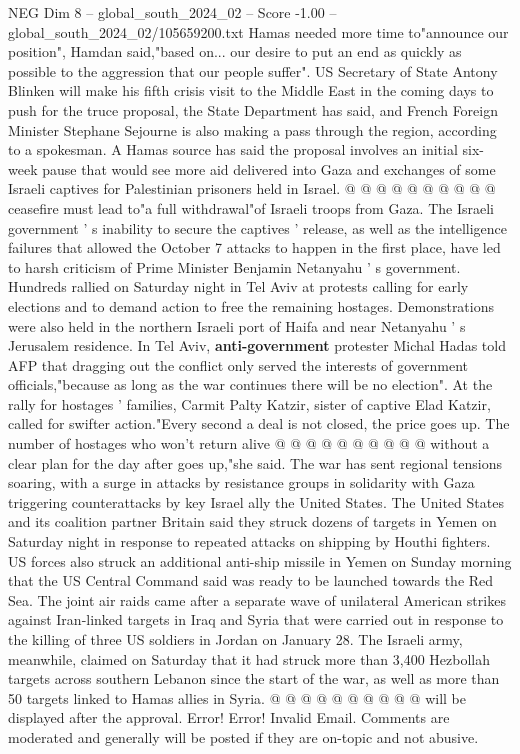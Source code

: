 \begin{textsample}{NEG Dim 8 – global\_south\_2024\_02 – Score -1.00 – global\_south\_2024\_02/105659200.txt}
Hamas needed more time to"announce our position", Hamdan said,"based on... our desire to put an end as quickly as possible to the aggression that our people suffer".
US Secretary of State Antony Blinken will make his fifth crisis visit to the Middle East in the coming days to push for the truce proposal, the State Department has said, and French Foreign Minister Stephane Sejourne is also making a pass through the region, according to a spokesman.
A Hamas source has said the proposal involves an initial six-week pause that would see more aid delivered into Gaza and exchanges of some Israeli captives for Palestinian prisoners held in Israel. @ @ @ @ @ @ @ @ @ @ ceasefire must lead to"a full withdrawal"of Israeli troops from Gaza.
The Israeli government ' s inability to secure the captives ' release, as well as the intelligence failures that allowed the October 7 attacks to happen in the first place, have led to harsh criticism of Prime Minister Benjamin Netanyahu ' s government.
Hundreds rallied on Saturday night in Tel Aviv at protests calling for early elections and to demand action to free the remaining hostages.
Demonstrations were also held in the northern Israeli port of Haifa and near Netanyahu ' s Jerusalem residence.
In Tel Aviv, \textbf{anti-government} protester Michal Hadas told AFP that dragging out the conflict only served the interests of government officials,"because as long as the war continues there will be no election".
At the rally for hostages ' families, Carmit Palty Katzir, sister of captive Elad Katzir, called for swifter action."Every second a deal is not closed, the price goes up.
The number of hostages who won't return alive @ @ @ @ @ @ @ @ @ @ without a clear plan for the day after goes up,"she said.
The war has sent regional tensions soaring, with a surge in attacks by resistance groups in solidarity with Gaza triggering counterattacks by key Israel ally the United States.
The United States and its coalition partner Britain said they struck dozens of targets in Yemen on Saturday night in response to repeated attacks on shipping by Houthi fighters.
US forces also struck an additional anti-ship missile in Yemen on Sunday morning that the US Central Command said was ready to be launched towards the Red Sea.
The joint air raids came after a separate wave of unilateral American strikes against Iran-linked targets in Iraq and Syria that were carried out in response to the killing of three US soldiers in Jordan on January 28.
The Israeli army, meanwhile, claimed on Saturday that it had struck more than 3,400 Hezbollah targets across southern Lebanon since the start of the war, as well as more than 50 targets linked to Hamas allies in Syria. @ @ @ @ @ @ @ @ @ @ will be displayed after the approval.
Error!
Error!
Invalid Email.
Comments are moderated and generally will be posted if they are on-topic and not abusive.

\end{textsample}
